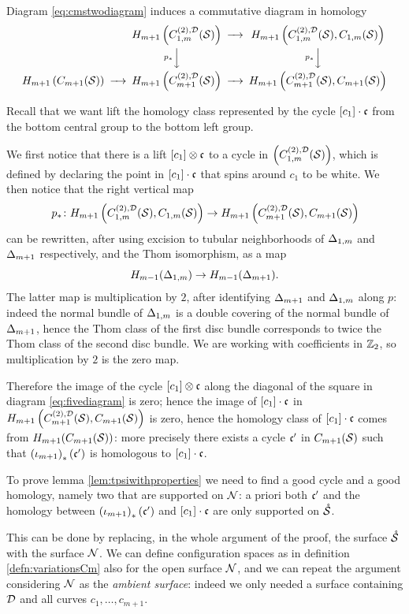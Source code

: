 Diagram \ref{eq:cmstwodiagram} induces a commutative diagram in homology
\begin{equation}
 \label{eq:fivediagram}
\minCDarrowwidth15pt
 \begin{CD}
  @. H_{m+1}\pa{\fmstwoD} @>>> H_{m+1}\pa{\fmstwoD, C_{1,m}(\S)}\\
  @. @V\p_*VV @V\p_*VV\\
  H_{m+1}\pa{ C_{m+1}(\S)} @>>> H_{m+1}\pa{\cmstwoD} @>>> H_{m+1}\pa{\cmstwoD,C_{m+1}(\S)}
 \end{CD}
\end{equation}

Recall that we want lift the homology class represented by the cycle $[c_1]\cdot\fc$
from the bottom central group to the bottom left group.

We first notice that there is a lift $[c_1]\otimes\fc$ to a cycle in $\pa{\fmstwoD}$,
which is defined by declaring the point in $[c_1]\cdot\fc$ that spins around $c_1$
to be white. We then notice that the right vertical map
\[
\p_*\colon H_{m+1}\pa{\fmstwoD, C_{1,m}(\S)} \to H_{m+1}\pa{\cmstwoD,C_{m+1}(\S)}
\]
can be rewritten, after using excision to tubular neighborhoods of $\Donem$ and $\Dmone$ respectively,
and the Thom isomorphism, as a map
\[
 H_{m-1}(\Donem)\to H_{m-1}(\Dmone).
\]
The latter map is multiplication by $2$, after identifying $\Dmone$ and $\Donem$ along $p$:
indeed the normal bundle of $\Donem$ is a
double covering of the normal bundle of $\Dmone$, hence the Thom class of the first disc
bundle corresponds to twice the Thom class of the second disc bundle. We are working
with coefficients in $\Z_2$, so multiplication by $2$ is the zero map.

Therefore the image of the cycle $[c_1]\otimes \fc$ along the diagonal of the square
in diagram \ref{eq:fivediagram} is zero; hence the image of $[c_1]\cdot\fc$ in $H_{m+1}\pa{\cmstwoD,C_{m+1}(\S)}$
is zero, hence the homology class of $[c_1]\cdot\fc$ comes from $H_{m+1}(C_{m+1}(\S))$: more
precisely there exists a cycle $\fc'$ in $C_{m+1}(\S)$ such that $\pa{\iota_{m+1}}_*(\fc')$ is homologous
to $[c_1]\cdot\fc$.

To prove lemma \ref{lem:tpsiwithproperties} we need to find a good cycle and
a good homology, namely two that are supported on $\N$: a priori both $\fc'$ and the homology
between $\pa{\iota_{m+1}}_*(\fc')$ and $[c_1]\cdot\fc$ are only supported on $\mrS$.

This can be done by replacing, in the whole argument of the proof, the surface $\mrS$ with the surface $\N$.
We can define configuration spaces as in definition \ref{defn:variationsCm} also for the open surface
$\N$, and we can repeat the argument considering $\N$ as the \emph{ambient surface}:
indeed we only needed a surface containing $\D$ and all curves $c_1,\dots,c_{m+1}$.

